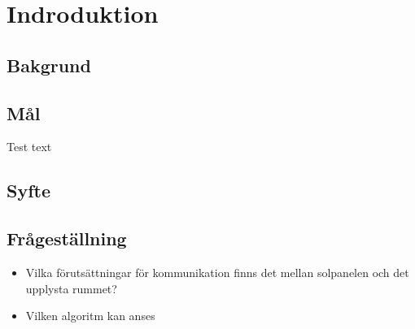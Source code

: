 \section{Indroduktion} %
\label{sec:indroduktion}

    \subsection{Bakgrund} %
    \label{sub:bakgrund}
    

    \subsection{Mål} %
    \label{sun:mal}
        Test text

    \subsection{Syfte} %
    \label{sub:syfte}
    

    \subsection{Frågeställning} %
    \label{sub:fragestallning}
        \begin{itemize}
            \item Vilka förutsättningar för kommunikation finns det mellan solpanelen och det upplysta rummet? \\
            \item Vilken algoritm kan anses 
        \end{itemize}
